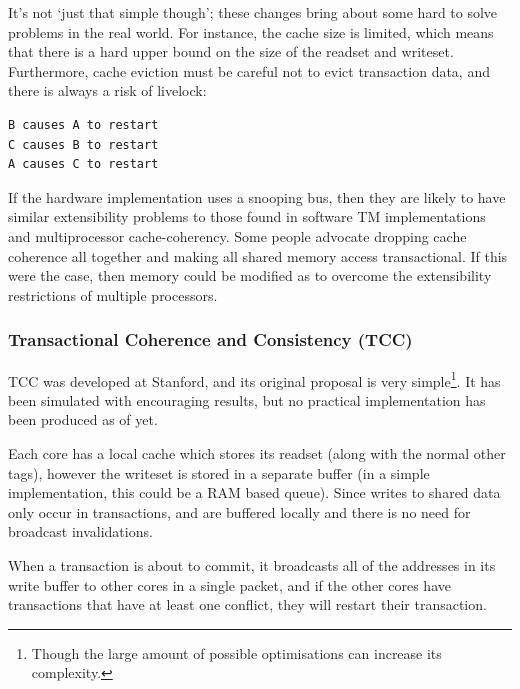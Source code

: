 It's not `just that simple though'; these changes bring about some
hard to solve problems in the real world. For instance, the cache size
is limited, which means that there is a hard upper bound on the size
of the readset and writeset. Furthermore, cache eviction must be
careful not to evict transaction data, and there is always a risk of
livelock:

\begin{verbatim}
B causes A to restart
C causes B to restart
A causes C to restart
\end{verbatim}

If the hardware implementation uses a snooping bus, then they are
likely to have similar extensibility problems to those found in
software TM implementations and multiprocessor cache-coherency. Some
people advocate dropping cache coherence all together and making all
shared memory access transactional. If this were the case, then memory
could be modified as to overcome the extensibility restrictions of
multiple processors.

\subsubsection{Transactional Coherence and Consistency (TCC)}

TCC was developed at Stanford, and its original proposal is very
simple\footnote{Though the large amount of possible optimisations can
increase its complexity.}. It has been simulated with encouraging
results, but no practical implementation has been produced as of yet.

Each core has a local cache which stores its readset (along with the
normal other tags), however the writeset is stored in a separate
buffer (in a simple implementation, this could be a RAM based
queue). Since writes to shared data only occur in transactions, and
are buffered locally and there is no need for broadcast invalidations.

When a transaction is about to commit, it broadcasts all of the
addresses in its write buffer to other cores in a single packet, and
if the other cores have transactions that have at least one conflict,
they will restart their transaction.


